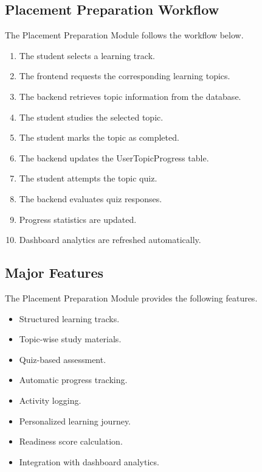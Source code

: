 \subsection{Placement Preparation Workflow}

The Placement Preparation Module follows the workflow below.

\begin{enumerate}

\item The student selects a learning track.

\item The frontend requests the corresponding learning topics.

\item The backend retrieves topic information from the database.

\item The student studies the selected topic.

\item The student marks the topic as completed.

\item The backend updates the UserTopicProgress table.

\item The student attempts the topic quiz.

\item The backend evaluates quiz responses.

\item Progress statistics are updated.

\item Dashboard analytics are refreshed automatically.

\end{enumerate}

\subsection{Major Features}

The Placement Preparation Module provides the following features.

\begin{itemize}

\item Structured learning tracks.

\item Topic-wise study materials.

\item Quiz-based assessment.

\item Automatic progress tracking.

\item Activity logging.

\item Personalized learning journey.

\item Readiness score calculation.

\item Integration with dashboard analytics.

\end{itemize}

